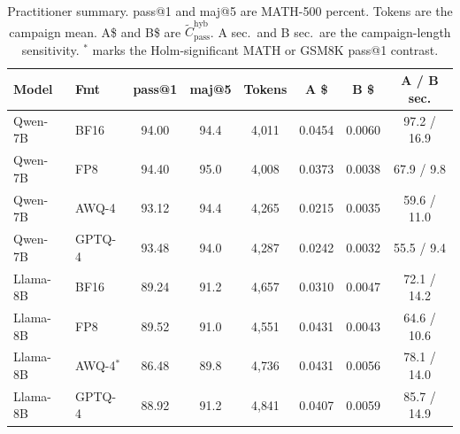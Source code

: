 \documentclass[11pt,a4paper]{article}
\begin{document}
\begin{table}[t]
\centering
\caption{Practitioner summary. pass@1 and maj@5 are MATH-500 percent. Tokens are the campaign mean. A\$ and B\$ are $\widetilde{C}_{\mathrm{pass}}^{\mathrm{hyb}}$. A sec.\ and B sec.\ are the campaign-length sensitivity. $^{*}$ marks the Holm-significant MATH or GSM8K pass@1 contrast.}
\label{tab:summary}
\small
\begin{tabular}{llcccccc}
\toprule
\textbf{Model} & \textbf{Fmt} & \textbf{pass@1} & \textbf{maj@5} & \textbf{Tokens} & \textbf{A \$} & \textbf{B \$} & \textbf{A / B sec.} \\
\midrule
Qwen-7B & BF16 & 94.00 & 94.4 & 4{,}011 & 0.0454 & 0.0060 & 97.2 / 16.9 \\
Qwen-7B & FP8 & 94.40 & 95.0 & 4{,}008 & 0.0373 & 0.0038 & 67.9 / 9.8 \\
Qwen-7B & AWQ-4 & 93.12 & 94.4 & 4{,}265 & 0.0215 & 0.0035 & 59.6 / 11.0 \\
Qwen-7B & GPTQ-4 & 93.48 & 94.0 & 4{,}287 & 0.0242 & 0.0032 & 55.5 / 9.4 \\
Llama-8B & BF16 & 89.24 & 91.2 & 4{,}657 & 0.0310 & 0.0047 & 72.1 / 14.2 \\
Llama-8B & FP8 & 89.52 & 91.0 & 4{,}551 & 0.0431 & 0.0043 & 64.6 / 10.6 \\
Llama-8B & AWQ-4$^{*}$ & 86.48 & 89.8 & 4{,}736 & 0.0431 & 0.0056 & 78.1 / 14.0 \\
Llama-8B & GPTQ-4 & 88.92 & 91.2 & 4{,}841 & 0.0407 & 0.0059 & 85.7 / 14.9 \\
\bottomrule
\end{tabular}
\end{table}
\end{document}
